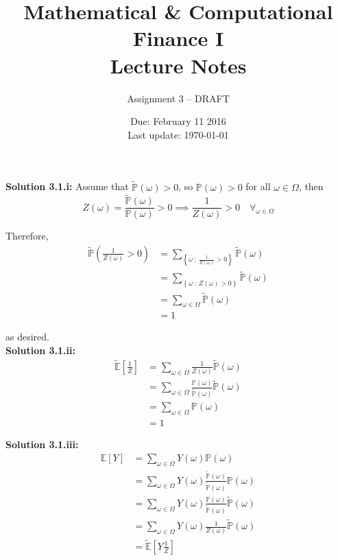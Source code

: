 \documentclass[12pt]{article}
\renewcommand{\P}{\mathbb P}
\newcommand{\E}{\mathbb E}
\begin{document}
 
 
\title{Mathematical \& Computational Finance I\\Lecture Notes}
\author{Assignment 3 -- DRAFT}
\date{Due: February 11 2016 \\ Last update: \today{}}
\maketitle

{\bf Solution 3.1.i:} Assume that $\tilde{\P}(\omega) > 0$, so $\P(\omega) > 0$ for all $\omega \in \Omega$, then
\begin{equation*}
	Z(\omega) = \frac{ \tilde{\P}(\omega) }{ \P(\omega) } > 0 \implies \frac{1}{Z(\omega)} > 0 \quad \forall_{\omega \in \Omega}
\end{equation*}

Therefore,
\begin{align*}
	\tilde{\P} \left( \frac{1}{Z(\omega)} > 0 \right) &= \sum_{ \left\{\omega~:~\frac{1}{Z(\omega)} > 0 \right\} } \tilde{\P}(\omega) \\
	&= \sum_{ \left\{\omega~:~Z(\omega) > 0 \right\} } \tilde{\P}(\omega) \\
	&= \sum_{ \omega \in \Omega } \tilde{\P}(\omega) \\
	&= 1
\end{align*}

as desired. \\

{\bf Solution 3.1.ii:}
\begin{align*}
	\tilde{\E} \left[ \frac{1}{Z} \right] &= \sum_{\omega \in \Omega} \frac{1}{Z(\omega)} \tilde{\P}(\omega) \\
	&= \sum_{\omega \in \Omega} \frac{ \P(\omega) }{ \tilde{\P}(\omega) } \tilde{\P}(\omega) \\ 
	&= \sum_{\omega \in \Omega} \P(\omega) \\
	&= 1
\end{align*}

{\bf Solution 3.1.iii:}
\begin{align*}
	\E[Y] &= \sum_{\omega \in \Omega} Y(\omega) \P(\omega) \\
	&= \sum_{\omega \in \Omega} Y(\omega) \frac{ \tilde{\P}(\omega) }{ \tilde{\P}(\omega) } \P(\omega) \\
	&= \sum_{\omega \in \Omega} Y(\omega) \frac{ \P(\omega) }{ \tilde{\P}(\omega) } \tilde{\P}(\omega) \\
	&= \sum_{\omega \in \Omega} Y(\omega) \frac{1}{Z(\omega)} \tilde{\P}(\omega) \\
	&= \tilde{\E} \left[ Y\frac{1}{Z} \right]
\end{align*}
\end{document}
